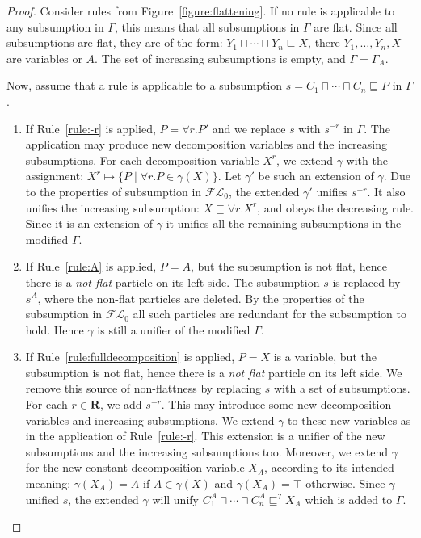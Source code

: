 \documentclass{article}
\newcommand{\flo}{\ensuremath{\mathcal{FL}_0}\xspace}
\newcommand{\roles}{\ensuremath{\mathbf{R}}\xspace}
\begin{document}
\begin{proof}
	Consider rules from Figure~\ref{figure:flattening}. If no rule is applicable to any subsumption in $\Gamma$,
	this means that all subsumptions in $\Gamma$ are flat. 
	Since all subsumptions are flat, they are of the form:
	$Y_1 \sqcap \cdots \sqcap Y_n \sqsubseteq X$, there $Y_1, \dots, Y_n, X$ are variables or $A$.
	The set of increasing subsumptions is empty, and $\Gamma = \Gamma_A$.
	
Now, assume that a rule is applicable to a subsumption $s = C_1 \sqcap \cdots \sqcap C_n \sqsubseteq P$ in $\Gamma$.	
\begin{enumerate}
	\item If Rule~\ref{rule:-r} is applied, $P = \forall r.P'$ and we replace $s$ with $s^{-r}$ in $\Gamma$.
	The application may produce new decomposition variables and the increasing subsumptions.
	For each decomposition variable $X^r$, we extend $\gamma$ with the assignment:
	$X^r \mapsto \{P \mid  \forall r.P \in \gamma(X)\}$. Let $\gamma'$ be such an extension of $\gamma$.
	Due to the properties of subsumption in \flo, the extended $\gamma'$ unifies $s^{-r}$.
	It also unifies the increasing subsumption: $X \sqsubseteq \forall r.X^r$, and obeys the decreasing rule.
	Since it is an extension of $\gamma$ it unifies all the remaining subsumptions in the modified $\Gamma$.
	
	
	\item If Rule~\ref{rule:A} is applied, $P=A$, but the subsumption is not flat, hence there is a \emph{not flat} particle on its left side. The subsumption $s$ is replaced by $s^A$, where the non-flat particles are deleted. By the properties of the subsumption in \flo all such particles are redundant for the subsumption to hold. Hence $\gamma$ is still a unifier of the modified $\Gamma$.
	
	\item If Rule~\ref{rule:fulldecomposition} is applied, $P= X$ is a variable, but the subsumption is not
	flat, hence there is a \emph{not flat} particle on its left side.
	We remove this source of non-flattness by replacing $s$ with a set of subsumptions.
	For each $r \in \roles$, we add $s^{-r}$. This may introduce some new decomposition variables and increasing subsumptions.
	We extend $\gamma$ to these new variables as in the application of Rule~\ref{rule:-r}. This extension
	is a unifier of the new subsumptions and the increasing subsumptions too.
	Moreover, we extend $\gamma$ for the new constant decomposition variable $X_A$,
	according to its intended meaning: $\gamma(X_A) = A$ if $A \in \gamma(X)$ and $\gamma(X_A) = \top$ otherwise. Since $\gamma$ unified $s$, the extended $\gamma$ will unify
	$C_1^{A} \sqcap \cdots \sqcap C_n^{A} \sqsubseteq^? X_A$ which is added to $\Gamma$.
	

\end{enumerate}
\end{proof}
\end{document}
